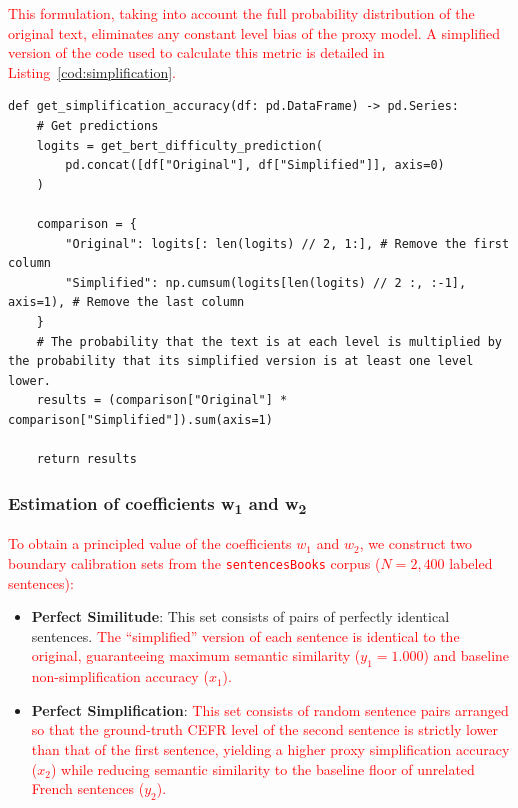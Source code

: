\textcolor{red}{This formulation, taking into account the full probability distribution of the original text, eliminates any constant level bias of the proxy model. A simplified version of the code used to calculate this metric is detailed in Listing~\ref{cod:simplification}.}

\begin{listing}
    \begin{verbatim}
def get_simplification_accuracy(df: pd.DataFrame) -> pd.Series:
    # Get predictions
    logits = get_bert_difficulty_prediction(
        pd.concat([df["Original"], df["Simplified"]], axis=0)
    )

    comparison = {
        "Original": logits[: len(logits) // 2, 1:], # Remove the first column
        "Simplified": np.cumsum(logits[len(logits) // 2 :, :-1], axis=1), # Remove the last column
    }
    # The probability that the text is at each level is multiplied by the probability that its simplified version is at least one level lower.
    results = (comparison["Original"] * comparison["Simplified"]).sum(axis=1)

    return results
\end{verbatim}
    \label{cod:simplification}
    \caption{Simplified version of the python code used to calculate the accuracy of the simplification. Each example corresponds to the average result that could be expected by the model on the test data.}
\end{listing}

\subsubsection[Estimation of coefficients w1 and w2]{Estimation of coefficients w\textsubscript{1} and w\textsubscript{2}}

\textcolor{red}{To obtain a principled value of the coefficients $w_1$ and $w_2$, we construct two boundary calibration sets from the \texttt{sentencesBooks} corpus ($N = 2{,}400$ labeled sentences):}

\begin{itemize}
    \item \textbf{Perfect Similitude}: This set consists of pairs of perfectly identical sentences. \textcolor{red}{The ``simplified'' version of each sentence is identical to the original, guaranteeing maximum semantic similarity ($y_1 = 1.000$) and baseline non-simplification accuracy ($x_1$).}
    \item \textbf{Perfect Simplification}: \textcolor{red}{This set consists of random sentence pairs arranged so that the ground-truth CEFR level of the second sentence is strictly lower than that of the first sentence, yielding a higher proxy simplification accuracy ($x_2$) while reducing semantic similarity to the baseline floor of unrelated French sentences ($y_2$).}
\end{itemize}

